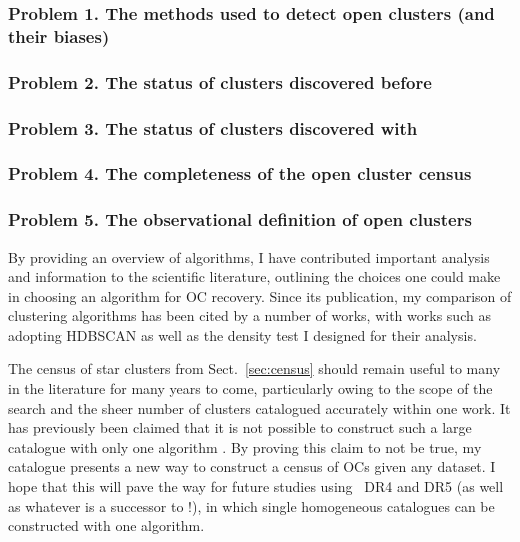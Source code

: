 \subsubsection{Problem 1. The methods used to detect open clusters (and their biases)}


\subsubsection{Problem 2. The status of clusters discovered before \gaia}


\subsubsection{Problem 3. The status of clusters discovered with \gaia}


\subsubsection{Problem 4. The completeness of the open cluster census}


\subsubsection{Problem 5. The observational definition of open clusters}



By providing an overview of algorithms, I have contributed important analysis and information to the scientific literature, outlining the choices one could make in choosing an algorithm for OC recovery. Since its publication, my comparison of clustering algorithms has been cited by a number of works, with works such as \cite{dellacroce_ongoing_hierarchical_2023a} adopting HDBSCAN as well as the density test I designed for their analysis.

The census of star clusters from Sect.~\ref{sec:census} should remain useful to many in the literature for many years to come, particularly owing to the scope of the search and the sheer number of clusters catalogued accurately within one work. It has previously been claimed that it is not possible to construct such a large catalogue with only one algorithm \citep{cantat-gaudin_clusters_2020}. By proving this claim to not be true, my catalogue presents a new way to construct a census of OCs given any dataset. I hope that this will pave the way for future studies using \gaia\ DR4 and DR5 (as well as whatever is a successor to \gaia!), in which single homogeneous catalogues can be constructed with one algorithm.

